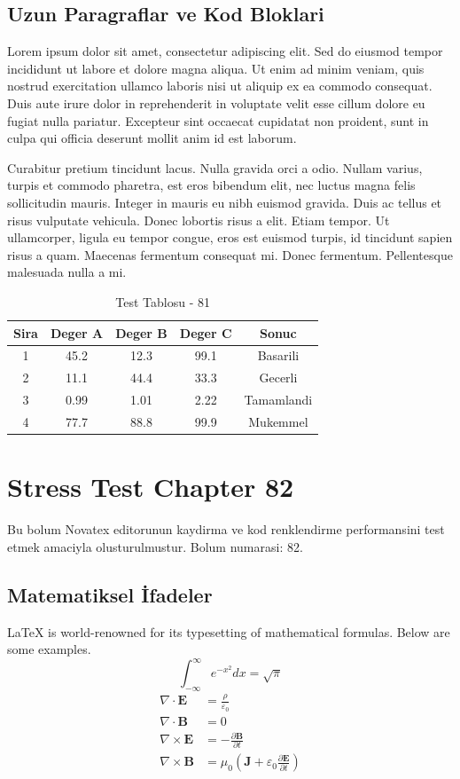\documentclass[12pt,a4paper]{article}
\begin{document}
\subsection{Uzun Paragraflar ve Kod Bloklari}
Lorem ipsum dolor sit amet, consectetur adipiscing elit. Sed do eiusmod tempor incididunt ut labore et dolore magna aliqua. Ut enim ad minim veniam, quis nostrud exercitation ullamco laboris nisi ut aliquip ex ea commodo consequat. Duis aute irure dolor in reprehenderit in voluptate velit esse cillum dolore eu fugiat nulla pariatur. Excepteur sint occaecat cupidatat non proident, sunt in culpa qui officia deserunt mollit anim id est laborum.

Curabitur pretium tincidunt lacus. Nulla gravida orci a odio. Nullam varius, turpis et commodo pharetra, est eros bibendum elit, nec luctus magna felis sollicitudin mauris. Integer in mauris eu nibh euismod gravida. Duis ac tellus et risus vulputate vehicula. Donec lobortis risus a elit. Etiam tempor. Ut ullamcorper, ligula eu tempor congue, eros est euismod turpis, id tincidunt sapien risus a quam. Maecenas fermentum consequat mi. Donec fermentum. Pellentesque malesuada nulla a mi.

\begin{table}[h!]
\centering
\begin{tabular}{|c|c|c|c|c|}
\hline
\textbf{Sira} & \textbf{Deger A} & \textbf{Deger B} & \textbf{Deger C} & \textbf{Sonuc} \\
\hline
1 & 45.2 & 12.3 & 99.1 & Basarili \\
2 & 11.1 & 44.4 & 33.3 & Gecerli \\
3 & 0.99 & 1.01 & 2.22 & Tamamlandi \\
4 & 77.7 & 88.8 & 99.9 & Mukemmel \\
\hline
\end{tabular}
\caption{Test Tablosu - 81}
\end{table}

\newpage
\section{Stress Test Chapter 82}
Bu bolum Novatex editorunun kaydirma ve kod renklendirme performansini test etmek amaciyla olusturulmustur. Bolum numarasi: 82.

\subsection{Matematiksel İfadeler}
\LaTeX{} is world-renowned for its typesetting of mathematical formulas. Below are some examples.
\begin{equation}
\int_{-\infty}^{\infty} e^{-x^2} dx = \sqrt{\pi}
\end{equation}
\begin{align}
\nabla \cdot \mathbf{E} &= \frac{\rho}{\varepsilon_0} \\
\nabla \cdot \mathbf{B} &= 0 \\
\nabla \times \mathbf{E} &= -\frac{\partial \mathbf{B}}{\partial t} \\
\nabla \times \mathbf{B} &= \mu_0\left(\mathbf{J} + \varepsilon_0 \frac{\partial \mathbf{E}}{\partial t}\right)
\end{align}
\end{document}
